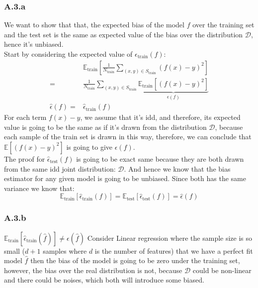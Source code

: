 \documentclass[]{article}
\begin{document}
    \subsubsection*{A.3.a}
        We want to show that that, the expected bias of the model $f$ over the training set and the test set is the same as expected value of the bias over the distribution $\mathcal{D}$, hence it's unbiased. 
        \\[1em]
        Start by considering the expected value of $\epsilon_\text{train}(f)$: 
        \begin{align*}\tag{A.3.a.1}\label{eqn:A.3.a.1}
            & \mathbb{E}_{\text{train}}\left[\frac{1}{N_\text{train}}
            \sum_{(x, y)\in S_\text{train}}^{}\left(
                f(x) - y
            \right)^2\right]
            \\
            = &
            \frac{1}{N_\text{train}} 
            \sum_{(x, y)\in S_\text{train}}^{}
            \underbrace{
                \mathbb{E}_{\text{train}}
                \left[ 
                \left(
                    f(x) - y
                \right)^2\right]
            }_{\epsilon(f)}
            \\
            \hat{\epsilon}(f)
            = &
            \hat{\epsilon}_{\text{train}}(f)
        \end{align*}
        For each term $f(x) - y$, we assume that it's idd, and therefore, its expected value is going to be the same as if it's drawn from the distribution $\mathcal{D}$, because each sample of the train set is drawn in this way, therefore, we can conclude that $\mathbb{E}\left[(f(x) - y)^2\right]$ is going to give $\epsilon(f)$. 
        \\[1em]
        The proof for $\hat{\epsilon}_\text{test}(f)$ is going to be exact same because they are both drawn from the same idd joint distribution: $\mathcal{D}$. And hence we know that the bias estimator for any given model is going to be unbiased. Since both has the same variance we know that: 
        \begin{equation*}\tag{A.3.a.2}\label{eqn:A.3.a.2}
            \mathbb{E}_\text{train}\left[\hat{\epsilon}_\text{train}(f)\right]
            =
            \mathbb{E}_\text{test}\left[\hat{\epsilon}_\text{test}(f)\right]
            =
            \hat{\epsilon}(f) 
        \end{equation*}
    \subsubsection*{A.3.b}
        $\mathbb{E}_{\text{train}}\left[\hat{\epsilon}_\text{train}(\hat{f})\right]\ne \epsilon(\hat{f})$ Consider Linear regression where the sample size is so small ($d + 1$ samples where $d$ is the number of features) that we have a perfect fit model $\hat{f}$ then the bias of the model is going to be zero under the training set, however, the bias over the real distribution is not, because $\mathcal{D}$ could be non-linear and there could be noises, which both will introduce some biased. 
\end{document}
